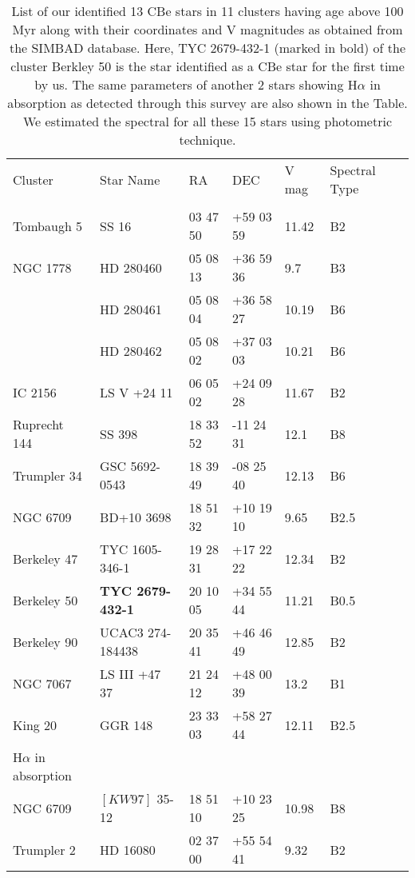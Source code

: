 \documentclass{jaa}
\begin{document}
 \begin{table*}
\caption{List of our identified 13 CBe stars in 11 clusters having age above 100 Myr along with their coordinates and V magnitudes as obtained from the SIMBAD database. Here, TYC 2679-432-1 (marked in bold) of the cluster Berkley 50 is the star identified as a CBe star for the first time by us. The same parameters of another 2 stars showing H$\alpha$ in absorption as detected through this survey are also shown in the Table. We estimated the spectral for all these 15 stars using photometric technique.}\label{Table:2}

\begin{tabular}{lllllll}
\hline
Cluster   & Star Name        & RA      & DEC      & V mag & Spectral Type                  \\ 
&&&&& \\ \hline
Tombaugh 5 & SS 16       & 03 47 50 & +59 03 59 & 11.42 & B2 \\
NGC 1778 & HD 280460        & 05 08 13 & +36 59 36 & 9.7  & B3&             \\
    & HD 280461        & 05 08 04 & +36 58 27 & 10.19 & B6           \\
    & HD 280462        & 05 08 02 & +37 03 03 & 10.21 & B6            \\
IC 2156   & LS V +24 11       & 06 05 02 & +24 09 28 & 11.67 & B2                 \\
Ruprecht 144 & SS 398         & 18 33 52 & -11 24 31 & 12.1 & B8                    \\
Trumpler 34 & GSC 5692-0543      & 18 39 49 & -08 25 40 & 12.13 & B6                   \\
NGC 6709   & BD+10 3698       & 18 51 32 & +10 19 10 & 9.65 & B2.5            \\
Berkeley 47 & TYC 1605-346-1     & 19 28 31 & +17 22 22 & 12.34 & B2                  \\
Berkeley 50 & \textbf{TYC 2679-432-1} & 20 10 05 & +34 55 44 & 11.21 & B0.5                   \\
Berkeley 90 & UCAC3 274-184438    & 20 35 41 & +46 46 49 & 12.85 & B2         \\
NGC 7067  & LS III +47 37 & 21 24 12  & +48 00 39 & 13.2 & B1               \\
King 20   & GGR 148       & 23 33 03 & +58 27 44 & 12.11 & B2.5               \\\hline

H$\alpha$ in absorption \\ \hline
NGC 6709 & $[KW97]$ 35-12 & 18 51 10 & +10 23 25 & 10.98 & B8 
 \\
Trumpler 2 & HD 16080 & 02 37 00 & +55 54 41 & 9.32 & B2
  \\ 
 \hline
\end{tabular}

\end{table*}

\label{lastpage}
\end{document}
